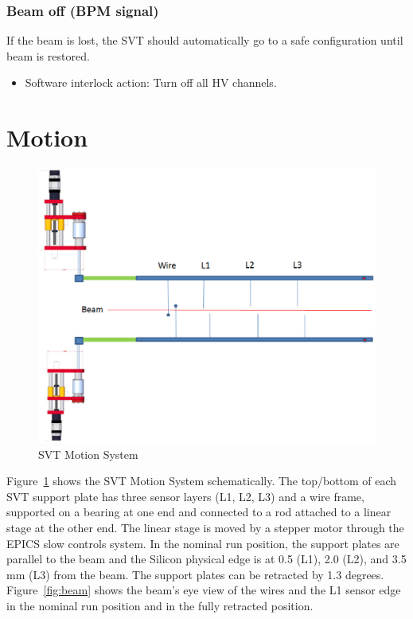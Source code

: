 \documentclass[12pt]{report}
\begin{document}
\subsubsection{Beam off (BPM signal)}
If the beam is lost, the SVT should automatically go to a safe configuration until beam is restored.
\begin{itemize}
\item Software interlock action: Turn off all HV channels.
\end{itemize}

\section{Motion}
\begin{figure}[ht!]
\centering
\includegraphics[width=15cm]{motion.eps}
\caption{SVT Motion System}
\label{fig:motion}
\end{figure}

Figure~\ref{fig:motion} shows the SVT Motion System schematically. The top/bottom of each SVT support plate has three sensor layers (L1, L2, L3) and a wire frame, supported on a bearing at one end and connected to a rod attached to a linear stage at the other end. The linear stage is moved by a stepper motor through the EPICS slow controls system. In the nominal run position, the support plates are parallel to the beam and the Silicon physical edge is at 0.5 (L1), 2.0 (L2), and 3.5 mm (L3) from the beam. The support plates can be retracted by 1.3 degrees. Figure~\ref{fig:beam} shows the beam's eye view of the wires and the L1 sensor edge in the nominal run position and in the fully retracted position.
\end{document}
